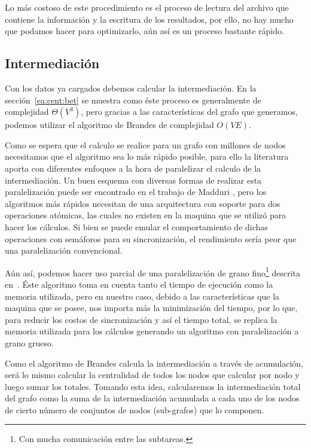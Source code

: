 

Lo más costoso de este procedimiento es el proceso de lectura del archivo que
contiene la información y la escritura de los resultados, por ello,
no hay mucho que podamos hacer para optimizarlo,
aún así es un proceso bastante rápido.

\subsection{Intermediación}
Con los datos ya cargados debemos calcular la intermediación. En la
sección~\ref{ea:cent:bet} se muestra como éste proceso es generalmente de
complejidad $\Theta (V^3)$, pero gracias a las
características del grafo que generamos, podemos utilizar el algoritmo de
Brandes\cite{brandes2001faster} de complejidad $O(VE)$.

Como se espera que el calculo se realice para un grafo con millones de nodos
necesitamos que el algoritmo sea lo más rápido posible, para ello la literatura
aporta con diferentes enfoques a la hora de paralelizar el calculo de la
intermediación. Un buen esquema con diversas formas de realizar esta
paralelización puede ser encontrado en el trabajo de Madduri
\etal\cite{madduri2009faster}, pero los algoritmos más rápidos necesitan de una
arquitectura con soporte para dos operaciones atómicas, las cuales no existen en
la maquina que se utilizó para hacer los cálculos.
Si bien se puede emular el comportamiento de dichas operaciones con semáforos
para su sincronización, el rendimiento sería peor que una paralelización
convencional.

Aún así, podemos hacer uso parcial de una paralelización de grano
fino\footnote{Con mucha comunicación entre las subtareas.} descrita
en~\cite{bader2006parallel}. Éste algoritmo toma en cuenta tanto el tiempo de
ejecución como la memoria utilizada, pero en nuestro caso, debido a las
características que la maquina que se posee, nos importa más la minimización
del tiempo, por lo que, para reducir los costos de sincronización y así el
tiempo total, se replica la memoria utilizada para los cálculos generando un
algoritmo con paralelización a grano grueso.

Como el algoritmo de Brandes calcula la intermediación a través de acumulación,
será lo mismo calcular la centralidad de todos los nodos que calcular por nodo y
luego sumar los totales. Tomando esta idea, calcularemos la intermediación total
del grafo como la suma de la intermediación acumulada a cada uno de los nodos de
cierto número de conjuntos de nodos (sub-grafos) que lo componen.


